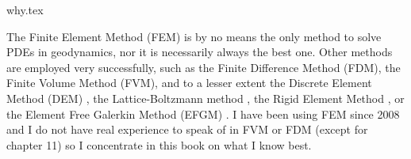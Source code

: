 \begin{flushright} {\tiny {\color{gray} why.tex}} \end{flushright}

The Finite Element Method (FEM) is by no means the only method 
to solve PDEs in geodynamics, nor it is necessarily always the best one.
Other methods are employed very successfully, such as the Finite Difference 
Method (FDM), the Finite Volume Method (FVM), and to a lesser extent
the Discrete Element Method (DEM) \cite{tasy05,egho07,egsc07,funi14,jitd23}, 
the Lattice-Boltzmann method \cite{hupc08}, the Rigid Element Method \cite{lacj15},  
or the Element Free Galerkin Method (EFGM) \cite{hans03}.
I have been using FEM since 2008 and I do not have real 
experience to speak of in FVM or FDM (except for chapter 11)
so I concentrate in this book 
on what I know best. 


